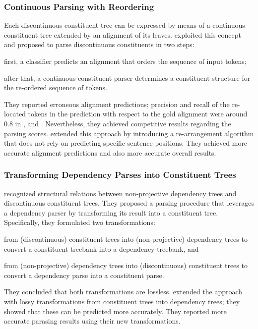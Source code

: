 \documentclass[../document.tex]{subfiles}
\begin{document}
    \subsubsection*{Continuous Parsing with Reordering}
    Each discontinuous constituent tree can be expressed by means of a continuous constituent tree extended by an alignment of its leaves.
     exploited this concept and proposed to parse discontinuous constituents in two steps:
    \begin{inparaenum}[]
        \item first, a classifier predicts an alignment that orders the sequence of input tokens; 
        \item after that, a continuous constituent parser determines a constituent structure for the re-ordered sequence of tokens.
    \end{inparaenum}
    They reported erroneous alignment predictions; precision and recall of the re-located tokens in the prediction with respect to the gold alignment were around $0.8$ in \dptb{}, \negra{} and \tiger{}.
    Nevertheless, they achieved competitive results regarding the parsing scores.
     extended this approach by introducing a re-arrangement algorithm that does not rely on predicting specific sentence positions.
    They achieved more accurate alignment predictions and also more accurate overall results.

    \subsubsection*{Transforming Dependency Parses into Constituent Trees}
     recognized structural relations between non-projective dependency trees and discontinuous constituent trees.
    They proposed a parsing procedure that leverages a dependency parser by transforming its result into a constituent tree.
    Specifically, they formulated two transformations:
    \begin{inparaenum}
        \item from (discontinuous) constituent trees into (non-projective) dependency trees to convert a constituent treebank into a dependency treebank, and
        \item from (non-projective) dependency trees into (discontinuous) constituent trees to convert a dependency parse into a constituent parse.
    \end{inparaenum}
    They concluded that both transformations are lossless.
     extended the approach with lossy transformations from constituent trees into dependency trees; they showed that these can be predicted more accurately.
    They reported more accurate parasing results using their new transformations.
\end{document}
